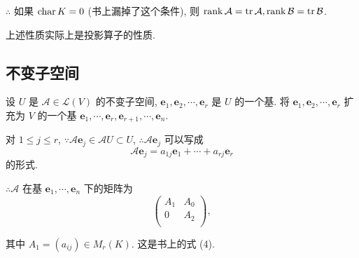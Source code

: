 \documentclass[color=black,device=normal,lang=cn,mode=geye]{elegantnote}
\begin{document}
$\therefore$ 如果 $\operatorname{char} K=0$ (书上漏掉了这个条件), 则 $\operatorname{rank} \mathcal{A}=\operatorname{tr} \mathcal{A},\operatorname{rank} \mathcal{B}=\operatorname{tr} \mathcal{B}$.

上述性质实际上是投影算子的性质.
\subsection{不变子空间}
设 $U$ 是 $\mathcal{A}\in\mathcal{L}(V)$ 的不变子空间, $\boldsymbol{e}_1,\boldsymbol{e}_2,\cdots,\boldsymbol{e}_r$ 是 $U$ 的一个基. 将 $\boldsymbol{e}_1,\boldsymbol{e}_2,\cdots,\boldsymbol{e}_r$ 扩充为 $V$ 的一个基 $\boldsymbol{e}_1,\cdots,\boldsymbol{e}_r,\boldsymbol{e}_{r+1},\cdots,\boldsymbol{e}_n$.

对 $1\leq j\leq r$, $\because\mathcal{A}\boldsymbol{e}_j\in\mathcal{A}U\subset U$, $\therefore\mathcal{A}\boldsymbol{e}_j$ 可以写成
\[\mathcal{A}\boldsymbol{e}_j=a_{1j}\boldsymbol{e}_1+\cdots+a_{rj}\boldsymbol{e}_r\]
的形式.

$\therefore\mathcal{A}$ 在基 $\boldsymbol{e}_1,\cdots,\boldsymbol{e}_n$ 下的矩阵为
\begin{equation}\label{eq3.1}
    \begin{pmatrix}
        A_1 & A_0 \\
        0 & A_2 \\
    \end{pmatrix},
\end{equation}

其中 $A_1=(a_{ij})\in M_r(K)$. 这是书上的式 (4).
\end{document}
